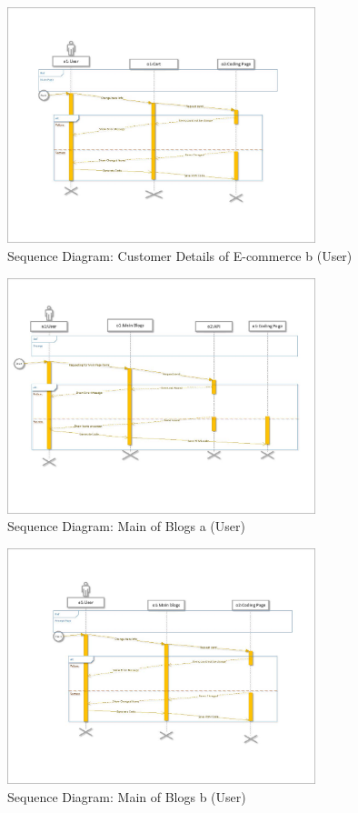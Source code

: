 \documentclass[12pt]{report}
\begin{document}
\begin{figure}[ht]
    \centering
    \includegraphics[width=0.8\textwidth]{Media/s1_Page_13.jpg} %
    \caption{Sequence Diagram: Customer Details of E-commerce b (User)}
    \label{fig:drawing1}
\end{figure}

\begin{figure}[ht]
    \centering
    \includegraphics[width=0.8\textwidth]{Media/s1_Page_14.jpg} %
    \caption{Sequence Diagram: Main of Blogs a (User)}
    \label{fig:drawing1}
\end{figure}

\begin{figure}[ht]
    \centering
    \includegraphics[width=0.8\textwidth]{Media/s1_Page_15.jpg} %
    \caption{Sequence Diagram: Main of Blogs b (User)}
    \label{fig:drawing1}
\end{figure}
\end{document}
